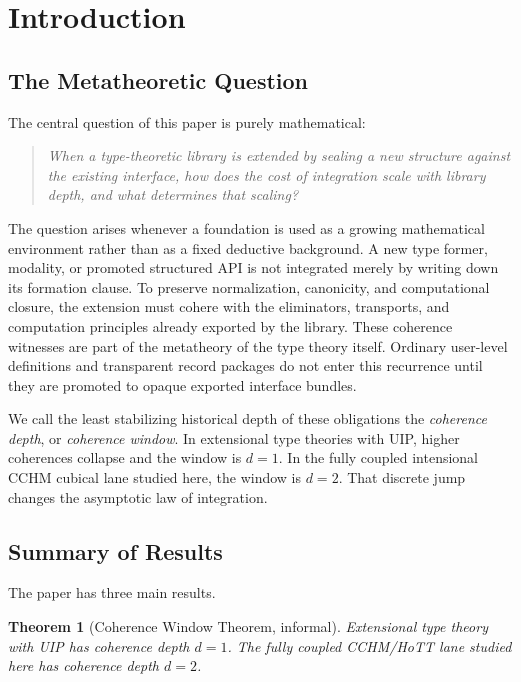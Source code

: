 \documentclass[11pt,a4paper]{article}
\theoremstyle{plain}
\newtheorem{theorem}{Theorem}[section]
\theoremstyle{definition}
\theoremstyle{remark}
\begin{document}
\tableofcontents
\clearpage

\section{Introduction}
\label{sec:introduction}

\subsection{The Metatheoretic Question}

The central question of this paper is purely mathematical:

\begin{quote}
\emph{When a type-theoretic library is extended by sealing a new structure against the existing interface, how does the cost of integration scale with library depth, and what determines that scaling?}
\end{quote}

The question arises whenever a foundation is used as a growing mathematical environment rather than as a fixed deductive background.  A new type former, modality, or promoted structured API is not integrated merely by writing down its formation clause.  To preserve normalization, canonicity, and computational closure, the extension must cohere with the eliminators, transports, and computation principles already exported by the library.  These coherence witnesses are part of the metatheory of the type theory itself.  Ordinary user-level definitions and transparent record packages do not enter this recurrence until they are promoted to opaque exported interface bundles.

We call the least stabilizing historical depth of these obligations the \emph{coherence depth}, or \emph{coherence window}.  In extensional type theories with UIP, higher coherences collapse and the window is $d=1$.  In the fully coupled intensional CCHM cubical lane studied here, the window is $d=2$.  That discrete jump changes the asymptotic law of integration.

\subsection{Summary of Results}

The paper has three main results.

\begin{theorem}[Coherence Window Theorem, informal]
Extensional type theory with UIP has coherence depth $d=1$.  The fully coupled CCHM/HoTT lane studied here has coherence depth $d=2$.
\end{theorem}
\end{document}
